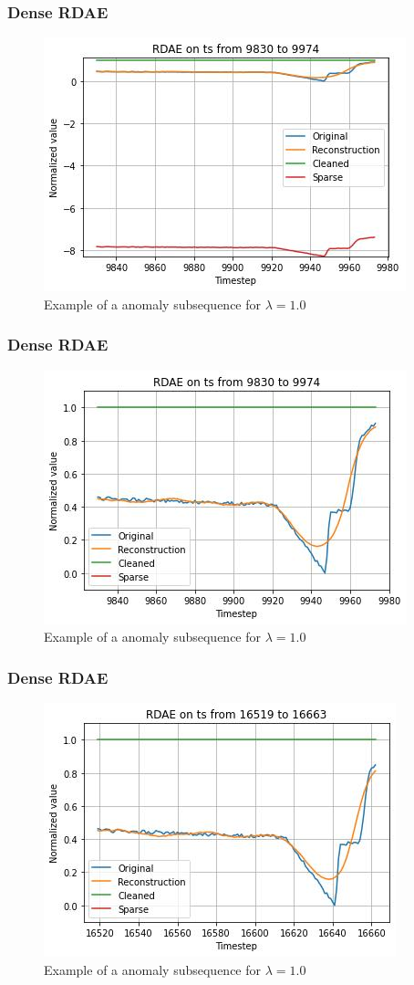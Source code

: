 \documentclass{beamer}
\theoremstyle{plain}
\theoremstyle{definition}
\theoremstyle{remark}
\begin{document}
\begin{frame}
	\frametitle{Dense RDAE}
	\begin{figure}
		\centering
		\includegraphics[width=0.7\linewidth]{Images/lam1.0ts_anomaly9830.jpg}
		\caption[]{Example of a anomaly subsequence for $\lambda=1.0$}
	\end{figure}
\end{frame}

\begin{frame}
	\frametitle{Dense RDAE}
	\begin{figure}
		\centering
		\includegraphics[width=0.7\linewidth]{Images/lam1.0ts_anomalyzoom9830.jpg}
		\caption[]{Example of a anomaly subsequence for $\lambda=1.0$}
	\end{figure}
\end{frame}

\begin{frame}
	\frametitle{Dense RDAE}
	\begin{figure}
		\centering
		\includegraphics[width=0.7\linewidth]{Images/lam1.0ts_anomalyzoom16519.jpg}
		\caption[]{Example of a anomaly subsequence for $\lambda=1.0$}
	\end{figure}
\end{frame}
\end{document}
